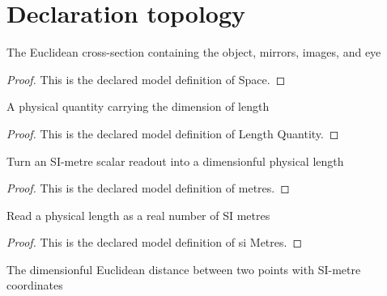 \section{Declaration topology}
\begin{definition}[Space]
  \label{def:physics:phyx-mini-0026:phyxminiproblems-problemphyxmini0026-space}
  The Euclidean cross-section containing the object, mirrors, images, and eye
\end{definition}
\begin{proof}
  This is the declared model definition of Space.
\end{proof}
\begin{definition}
  \label{def:physics:phyx-mini-0026:phyxminiproblems-problemphyxmini0026-lengthquantity}
  A physical quantity carrying the dimension of length
\end{definition}
\begin{proof}
  This is the declared model definition of Length Quantity.
\end{proof}
\begin{definition}[metres]
  \label{def:physics:phyx-mini-0026:phyxminiproblems-problemphyxmini0026-metres}
  Turn an SI-metre scalar readout into a dimensionful physical length
\end{definition}
\begin{proof}
  This is the declared model definition of metres.
\end{proof}
\begin{definition}[si Metres]
  \label{def:physics:phyx-mini-0026:phyxminiproblems-problemphyxmini0026-simetres}
  Read a physical length as a real number of SI metres
\end{definition}
\begin{proof}
  This is the declared model definition of si Metres.
\end{proof}
\begin{definition}
  \label{def:physics:phyx-mini-0026:phyxminiproblems-problemphyxmini0026-physicaldistance}
  The dimensionful Euclidean distance between two points with SI-metre coordinates
\end{definition}
